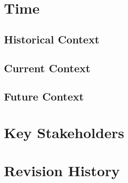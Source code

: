 \documentclass[12pt]{article}
\begin{document}
\section*{Time}

\subsection*{Historical Context}

\subsection*{Current Context}

\subsection*{Future Context}

\section*{Key Stakeholders}

\newpage
\section*{Revision History}
\end{document}
